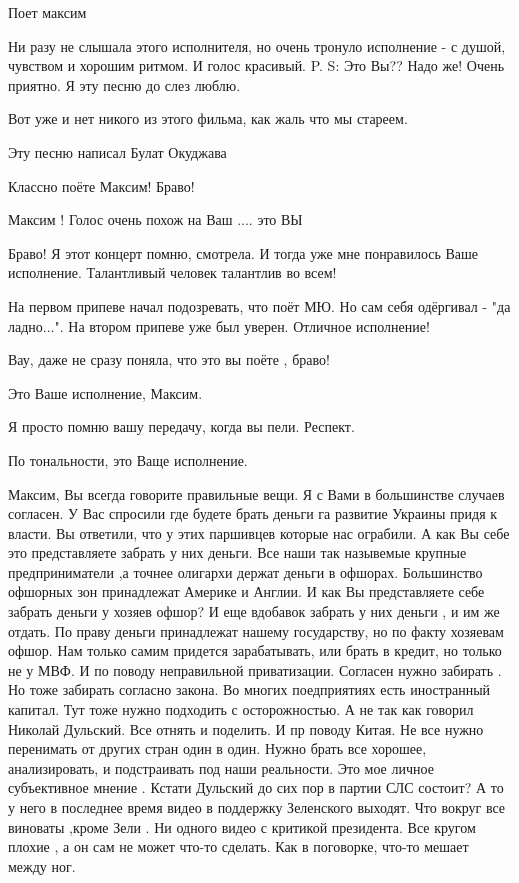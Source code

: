 \begin{itemize}
\begin{multicols}{2}
Поет максим


Ни разу не слышала этого исполнителя, но очень тронуло исполнение -  с душой,
чувством и хорошим ритмом. И голос  красивый. P. S: Это  Вы?? Надо же! Очень
приятно. Я эту песню до слез  люблю.

Вот уже и нет никого из этого фильма, как жаль что мы стареем.

Эту песню написал Булат Окуджава

Классно поёте Максим! Браво!

Максим ! Голос очень похож на Ваш    .... это ВЫ


Браво! Я этот концерт помню, смотрела. И тогда уже мне понравилось Ваше
исполнение. Талантливый человек талантлив во всем!


На первом припеве начал подозревать, что поёт МЮ. Но сам себя одёргивал - "да
ладно...". На втором припеве уже был уверен. Отличное исполнение!

Вау, даже не сразу поняла, что это вы поёте , браво!


Это Ваше исполнение, Максим.

Я просто помню вашу передачу, когда вы пели. Респект.

По тональности,  это Ваще исполнение.


Максим, Вы всегда говорите правильные вещи. Я с Вами в большинстве случаев
согласен. У Вас спросили где будете брать деньги га развитие Украины придя к
власти. Вы ответили, что у этих паршивцев которые нас ограбили. А как Вы себе
это представляете забрать у них деньги. Все наши так назывемые крупные
предприниматели ,а точнее олигархи держат деньги в офшорах. Большинство
офшорных зон принадлежат Америке и Англии. И как Вы представляете себе забрать
деньги у хозяев офшор? И еще вдобавок забрать у них деньги , и им же отдать. По
праву деньги принадлежат нашему государству, но по факту хозяевам офшор. Нам
только самим придется зарабатывать, или брать  в кредит, но только не у МВФ. И
по поводу неправильной приватизации. Согласен нужно забирать . Но тоже забирать
согласно закона. Во многих поедприятиях есть иностранный капитал. Тут тоже
нужно подходить с осторожностью. А не так как говорил Николай Дульский. Все
отнять и поделить. И пр поводу Китая. Не все нужно перенимать от других стран
один в один. Нужно брать все хорошее, анализировать, и подстраивать под наши
реальности. Это мое личное субъективное мнение . Кстати Дульский до сих пор в
партии СЛС состоит? А то у него в последнее время видео в поддержку Зеленского
выходят. Что вокруг все виноваты ,кроме Зели . Ни одного видео с критикой
президента. Все кругом плохие , а он сам не может что-то сделать. Как в
поговорке, что-то мешает между ног.


\end{multicols}
\end{itemize}
